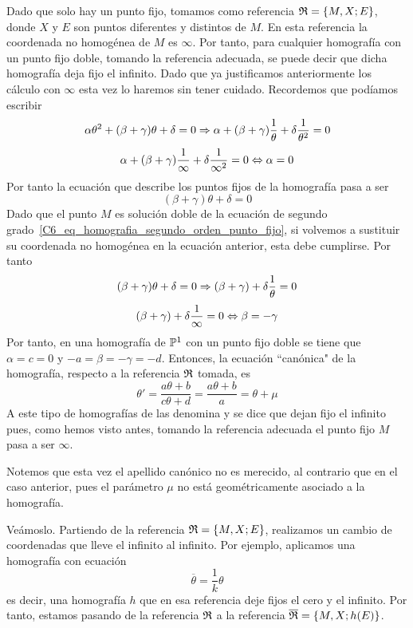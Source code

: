 Dado que solo hay un punto fijo, tomamos como referencia $\mathfrak{R}=\{M,X;E\}$, donde $X$ y $E$ son puntos diferentes y distintos de $M$. En esta referencia la coordenada no homogénea de $M$ es $\infty$. Por tanto, para cualquier homografía con un punto fijo doble, tomando la referencia adecuada, se puede decir que dicha homografía deja fijo el infinito. Dado que ya justificamos anteriormente los cálculo con $\infty$ esta vez lo haremos sin tener cuidado. Recordemos que podíamos escribir
\begin{equation*}
	\alpha\theta^2+(\beta+\gamma)\theta+\delta=0\Rightarrow\alpha+(\beta+\gamma)\frac{1}{\theta}+\delta\frac{1}{\theta^2}=0
\end{equation*}
\begin{equation*}
	\alpha+(\beta+\gamma)\frac{1}{\infty}+\delta\frac{1}{\infty^2}=0\Leftrightarrow \alpha=0
\end{equation*}
Por tanto la ecuación que describe los puntos fijos de la homografía pasa a ser
\begin{equation*}
	(\beta+\gamma)\theta+\delta=0
\end{equation*}
Dado que el punto $M$ es solución doble de la ecuación de segundo grado~\eqref{C6_eq_homografia_segundo_orden_punto_fijo}, si volvemos a sustituir su coordenada no homogénea en la ecuación anterior, esta debe cumplirse. Por tanto
\begin{equation*}
	(\beta+\gamma)\theta+\delta=0\Rightarrow(\beta+\gamma)+\delta\frac{1}{\theta}=0
\end{equation*}
\begin{equation*}
	(\beta+\gamma)+\delta\frac{1}{\infty}=0\Leftrightarrow \beta=-\gamma
\end{equation*}
Por tanto, en una homografía de $\mathbb{P}^1$ con un punto fijo doble se tiene que $\alpha=c=0$ y $-a=\beta=-\gamma=-d$. Entonces, la ecuación ``canónica" de la homografía, respecto a la referencia $\mathfrak{R}$ tomada, es
\begin{equation}
\theta'=\frac{a\theta+b}{c\theta +d}=\frac{a\theta+b}{a}=\theta+\mu
\end{equation}
A este tipo de homografías de las denomina  y se dice que dejan fijo el infinito pues, como hemos visto antes, tomando la referencia adecuada el punto fijo $M$ pasa a ser $\infty$.

Notemos que esta vez el apellido canónico no es merecido, al contrario que en el caso anterior, pues el parámetro $\mu$ no está geométricamente asociado a la homografía. 

Veámoslo. Partiendo de la referencia $\mathfrak{R}=\{M,X;E\}$, realizamos un cambio de coordenadas que lleve el infinito al infinito. Por ejemplo, aplicamos una homografía con ecuación
\begin{equation*}
	\overline{\theta}=\frac{1}{k}\theta
\end{equation*}
es decir, una homografía $h$ que en esa referencia deje fijos el cero y el infinito. Por tanto, estamos pasando de la referencia $\mathfrak{R}$ a la referencia $\overline{\mathfrak{R}}=\{M,X;h(E)\}$. 

